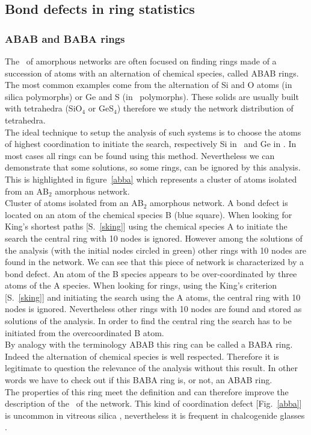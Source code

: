 \subsection{Bond defects in ring statistics}
\label{rdef}
\subsubsection{ABAB and BABA rings}
\label{ababrings}

The \rstat\ of amorphous networks are often focused on finding rings made of a succession of atoms with an alternation of chemical species, called ABAB rings. 
The most common examples come from the alternation of Si and O atoms (in silica polymorphs) or Ge and S (in \ges\ polymorphs). 
These solids are usually built with tetrahedra (SiO$_4$ or GeS$_4$) therefore we study the network distribution of tetrahedra. \\
The ideal technique to setup the analysis of such systems is to choose the atoms of highest coordination to initiate the search, respectively Si in \sio\ and Ge in \ges. 
In most cases all rings can be found using this method. 
Nevertheless we can demonstrate that some solutions, so some rings, can be ignored by this analysis. 
This is highlighted in figure~\ref{abba} which represents a cluster of atoms isolated from an AB$_2$ amorphous network. \\ 
{Cluster of atoms isolated from an AB$_2$ amorphous network. 
A bond defect is located on an atom of the chemical species B (blue square). 
When looking for King's shortest paths [S.~\ref{sking}] using the chemical species A to initiate the search the central ring with 10 nodes is ignored. 
However among the solutions of the analysis (with the initial nodes circled in green) other rings with 10 nodes are found in the network.}
\laf We can see that this piece of network is characterized by a bond defect. 
An atom of the B species appears to be over-coordinated by three atoms of the A species. 
When looking for rings, using the King's criterion [S.~\ref{sking}] and initiating the search using the A atoms, the central ring with 10 nodes is ignored. 
Nevertheless other rings with 10 nodes are found and stored as solutions of the analysis. 
In order to find the central ring the search has to be initiated from the overcoordinated B atom. \\
By analogy with the terminology ABAB this ring can be called a BABA ring. 
Indeed the alternation of chemical species is well respected. 
Therefore it is legitimate to question the relevance of the analysis without this result. 
In other words we have to check out if this BABA ring is, or not, an ABAB ring. \\
The properties of this ring meet the definition and can therefore improve the description of the \con\ of the network. 
This kind of coordination defect [Fig.~\ref{abba}] is uncommon in vitreous silica \cite{PhysRevB.47.3053, PhysRevB.48.9359}, nevertheless it is frequent in chalcogenide glasses \cite{2004PhRvB..69f4201B, JPCM-19.196102-2007}. 

